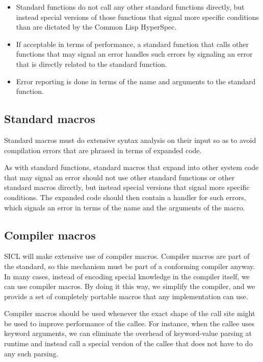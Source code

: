 \documentclass{article}
\def\sysname{SICL}
\begin{document}
\begin{itemize}
\item Standard functions do not call any other standard functions
  directly, but instead special versions of those functions that
  signal more specific conditions than are dictated by the Common Lisp
  HyperSpec. 
\item If acceptable in terms of performance, a standard function that
  calls other functions that may signal an error handles such errors
  by signaling an error that is directly related to the standard
  function. 
\item Error reporting is done in terms of the name and arguments to
  the standard function. 
\end{itemize}

\subsection{Standard macros}

Standard macros must do extensive syntax analysis on their input so as
to avoid compilation errors that are phrased in terms of expanded
code.  

As with standard functions, standard macros that expand into other
system code that may signal an error should not use other standard
functions or other standard macros directly, but instead special
versions that signal more specific conditions.  The expanded code
should then contain a handler for such errors, which signals an error
in terms of the name and the arguments of the macro. 

\subsection{Compiler macros}

{\sysname} will make extensive use of compiler macros.  Compiler
macros are part of the standard, so this mechanism must be part of a
conforming compiler anyway.  In many cases, instead of encoding
special knowledge in the compiler itself, we can use compiler macros.
By doing it this way, we simplify the compiler, and we provide a set
of completely portable macros that any implementation can use. 

Compiler macros should be used whenever the exact shape of the call
site might be used to improve performance of the callee.  For
instance, when the callee uses keyword arguments, we can eliminate the
overhead of keyword-value parsing at runtime and instead call a
special version of the callee that does not have to do any such
parsing.  
\end{document}
